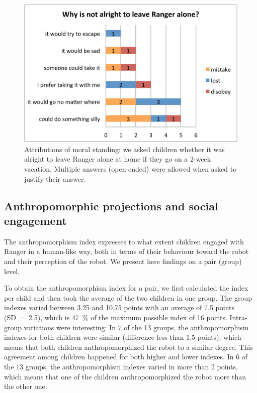 \documentclass{sig-alternate}
\begin{document}
\begin{figure}[!h]
    \centering 
    \includegraphics[width=1.0\linewidth]{domino-leave-why.pdf}
    \caption{\small Attributions of moral
        standing: we asked children whether it was alright to leave Ranger
        alone at home if they go on a 2-week vacation. Multiple answers
        (open-ended) were allowed when asked to justify their answer.}

    \label{fig:domino-leave-alone} 
\end{figure}

\subsection{Anthropomorphic projections and social engagement}

The anthropomorphism index expresses to what extent children engaged with Ranger
in a human-like way, both in terms of their behaviour toward the robot and their
perception of the robot. We present here findings on a pair (group) level.

To obtain the anthropomorphism index for a pair, we first calculated the index
per child and then took the average of the two children in one group.  The group
indexes varied between 3.25 and 10.75 points with an average of 7.5 points
(SD~=~2.5), which is 47~\% of the maximum possible index of 16 points.
Intra-group variations were interesting: In 7 of the 13 groups, the
anthropomorphism indexes for both children were similar (difference less than
1.5 points), which means that both children anthropomorphized the robot to a
similar degree. This agreement among children happened for both higher and lower
indexes. In 6 of the 13 groups, the anthropomorphism indexes varied in more than
2 points, which means that one of the children anthropomorphized the robot more
than the other one.
\end{document}

